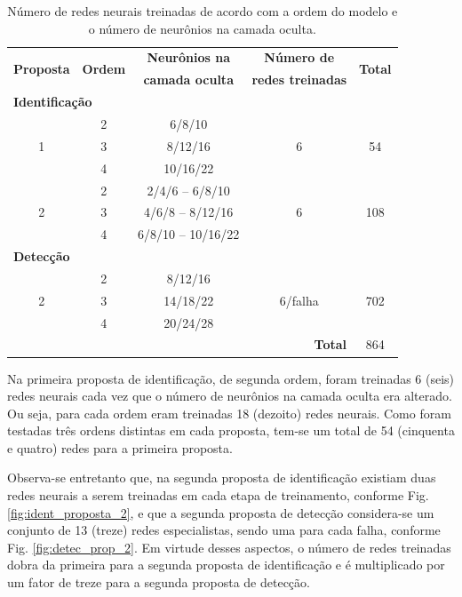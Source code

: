 \begin{table}[htb]
\small
\centering
\caption[Número de redes neurais treinadas]{Número de redes neurais treinadas de
acordo com a ordem do modelo e o número de neurônios na camada oculta.}
\label{tab:treinamentos}
\vspace{0.25cm}
\begin{tabular}{|c|c|c|c|c|}
\hline
\multirow{2}{*}{\bf Proposta} & 
\multirow{2}{*}{\bf Ordem} & 
{\bf Neurônios na} & 
{\bf Número de} & 
\multirow{2}{*}{\bf Total}\\
& & {\bf camada oculta} & {\bf redes treinadas} &\\
\hline
\hline
\multicolumn{5}{|l|}{{\bf Identificação}}\\
\hline
\multirow{3}{*}{1} & 2 & 6/8/10 & \multirow{3}{*}{6} & \multirow{3}{*}{54}\\
\cline{2-3}
& 3 & 8/12/16 & &\\
\cline{2-3}
& 4 & 10/16/22 & &\\
\hline
\multirow{3}{*}{2} & 2 & 2/4/6 -- 6/8/10 & 
\multirow{3}{*}{6} & \multirow{3}{*}{108}\\
\cline{2-3}
& 3 & 4/6/8 -- 8/12/16 & & \\
\cline{2-3}
& 4 & 6/8/10 -- 10/16/22 & & \\
\hline
\multicolumn{5}{|l|}{{\bf Detecção}}\\
\hline
\multirow{3}{*}{2} & 2 & 8/12/16 & 
\multirow{3}{*}{6/falha} &
\multirow{3}{*}{702}\\
\cline{2-3}
& 3 & 14/18/22 & &\\
\cline{2-3}
& 4 & 20/24/28 & &\\
\hline
\hline
\multicolumn{4}{|r|}{{\bf Total}} & 864\\
\hline
\end{tabular}
\end{table}

Na primeira proposta de identificação, de segunda ordem, foram treinadas 6
(seis) redes neurais cada vez que o número de neurônios na camada oculta era
alterado. Ou seja, para cada ordem eram treinadas 18 (dezoito) redes neurais.
Como foram testadas três ordens distintas em cada proposta, tem-se um total de
54 (cinquenta e quatro) redes para a primeira proposta.

Observa-se entretanto que, na segunda proposta de identificação existiam duas
redes neurais a serem treinadas em cada etapa de treinamento, conforme Fig.
\ref{fig:ident_proposta_2}, e que a segunda proposta de detecção considera-se um
conjunto de 13 (treze) redes especialistas, sendo uma para cada falha, conforme
Fig. \ref{fig:detec_prop_2}. Em virtude desses aspectos, o número de redes
treinadas dobra da primeira para a segunda proposta de identificação e é
multiplicado por um fator de treze para a segunda proposta de detecção.

